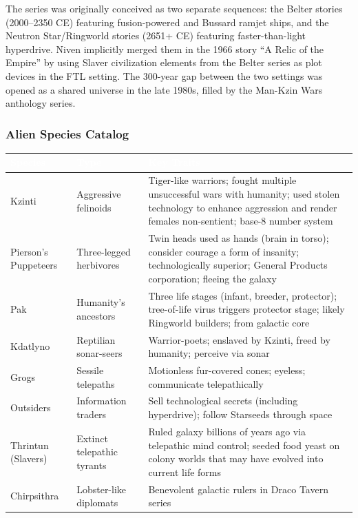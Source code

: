 \documentclass[11pt,letterpaper]{article}
\newcommand{\tableheader}[1]{\textbf{\sffamily\textcolor{white}{#1}}}
\begin{document}
The series was originally conceived as two separate sequences: the Belter stories (2000--2350 CE) featuring fusion-powered and Bussard ramjet ships, and the Neutron Star/Ringworld stories (2651+ CE) featuring faster-than-light hyperdrive. Niven implicitly merged them in the 1966 story ``A Relic of the Empire'' by using Slaver civilization elements from the Belter series as plot devices in the FTL setting. The 300-year gap between the two settings was opened as a shared universe in the late 1980s, filled by the Man-Kzin Wars anthology series.

\subsubsection{Alien Species Catalog}

\begin{center}
\begin{tabularx}{\textwidth}{L{2.5cm}L{2.5cm}X}
\toprule
{}
\tableheader{Species} & \tableheader{Type} & \tableheader{Key Traits} \\
\midrule
Kzinti & Aggressive felinoids & Tiger-like warriors; fought multiple unsuccessful wars with humanity; used stolen technology to enhance aggression and render females non-sentient; base-8 number system \\
Pierson's Puppeteers & Three-legged herbivores & Twin heads used as hands (brain in torso); consider courage a form of insanity; technologically superior; General Products corporation; fleeing the galaxy \\
Pak & Humanity's ancestors & Three life stages (infant, breeder, protector); tree-of-life virus triggers protector stage; likely Ringworld builders; from galactic core \\
Kdatlyno & Reptilian sonar-seers & Warrior-poets; enslaved by Kzinti, freed by humanity; perceive via sonar \\
Grogs & Sessile telepaths & Motionless fur-covered cones; eyeless; communicate telepathically \\
Outsiders & Information traders & Sell technological secrets (including hyperdrive); follow Starseeds through space \\
Thrintun (Slavers) & Extinct telepathic tyrants & Ruled galaxy billions of years ago via telepathic mind control; seeded food yeast on colony worlds that may have evolved into current life forms \\
Chirpsithra & Lobster-like diplomats & Benevolent galactic rulers in Draco Tavern series \\
\bottomrule
\end{tabularx}
\end{center}
\end{document}
